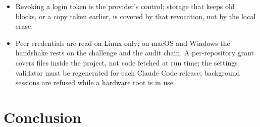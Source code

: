 \documentclass[11pt]{article}
\begin{document}
\begin{itemize}[nosep]
  not prevented. A bind-mounted file deeper than the inode index's
  budgets in a very large tree is not matched.
\item Revoking a login token is the provider's control; storage that
  keeps old blocks, or a copy taken earlier, is covered by that
  revocation, not by the local erase.
\item Peer credentials are read on Linux only; on macOS and Windows the
  handshake rests on the challenge and the audit chain. A per-repository
  grant covers files inside the project, not code fetched at run time;
  the settings validator must be regenerated for each Claude Code
  release; background sessions are refused while a hardware root is in
  use.
\end{itemize}

\section{Conclusion}
\label{sec:conclusion}
\end{document}

